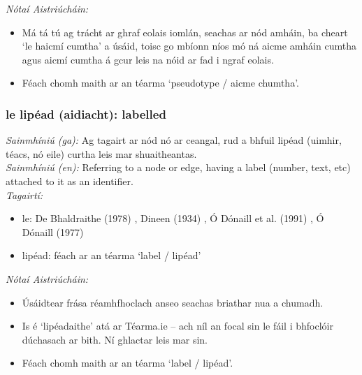 \documentclass{article}
\begin{document}
 \noindent \textit{Nótaí Aistriúcháin:}
\begin{itemize}
	\item Má tá tú ag trácht ar ghraf eolais iomlán, seachas ar nód amháin, ba cheart `le haicmí cumtha' a úsáid, toisc go mbíonn níos mó ná aicme amháin cumtha agus aicmí cumtha á gcur leis na nóid ar fad i ngraf eolais.
	\item Féach chomh maith ar an téarma `pseudotype / aicme chumtha'.
\end{itemize}


\subsubsection*{le lipéad (aidiacht): labelled}
 \noindent \textit{Sainmhíniú (ga):} Ag tagairt ar nód nó ar ceangal, rud a bhfuil lipéad (uimhir, téacs, nó eile) curtha leis mar shuaitheantas.
\\
 \noindent \textit{Sainmhíniú (en):} Referring to a node or edge, having a label (number, text, etc) attached to it as an identifier.
\\
 \noindent \textit{Tagairtí:}
\begin{itemize}
	\item le: De Bhaldraithe (1978) \cite{de-bhaldraithe}, Dineen (1934) \cite{dineen}, Ó Dónaill et al. (1991) \cite{focloir-beag}, Ó Dónaill (1977) \cite{odonaill}
	\item lipéad: féach ar an téarma `label / lipéad'
\end{itemize}

 \noindent \textit{Nótaí Aistriúcháin:}
\begin{itemize}
	\item Úsáidtear frása réamhfhoclach anseo seachas briathar nua a chumadh.
	\item Is é `lipéadaithe' atá ar Téarma.ie -- ach níl an focal sin le fáil i bhfoclóir dúchasach ar bith. Ní ghlactar leis mar sin.
	\item Féach chomh maith ar an téarma `label / lipéad'.
\end{itemize}
\end{document}
